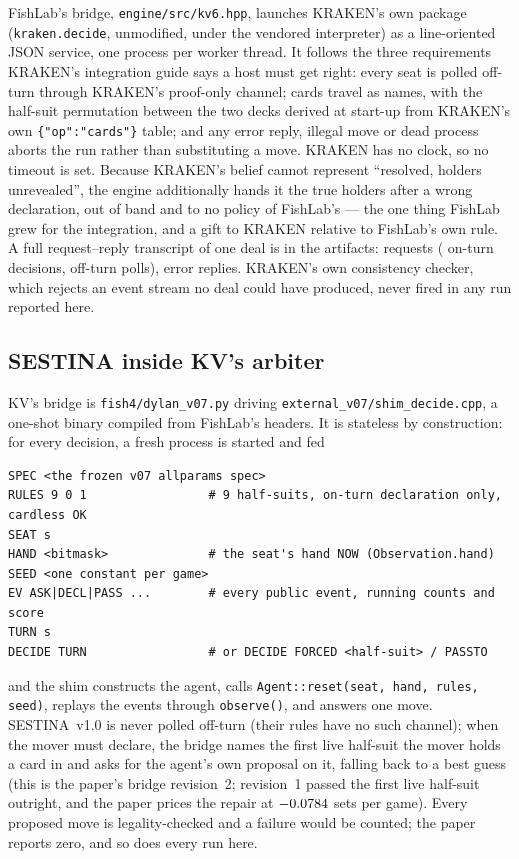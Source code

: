 \documentclass[11pt]{article}
\newcommand{\code}[1]{\texttt{#1}}
\newcommand{\sestina}{\mbox{SESTINA v1.0}}
\begin{document}
FishLab's bridge, \code{engine/src/kv6.hpp}, launches KRAKEN's own package (\code{kraken.decide},
unmodified, under the vendored interpreter) as a line-oriented JSON service, one process per worker
thread. It follows the three requirements KRAKEN's integration guide says a host must get right: every
seat is polled off-turn through KRAKEN's proof-only channel; cards travel as names, with the half-suit
permutation between the two decks derived at start-up from KRAKEN's own \code{\{"op":"cards"\}} table;
and any error reply, illegal move or dead process aborts the run rather than substituting a move. KRAKEN
has no clock, so no timeout is set. Because KRAKEN's belief cannot represent ``resolved, holders
unrevealed'', the engine additionally hands it the true holders after a wrong declaration, out of band
and to no policy of FishLab's --- the one thing FishLab grew for the integration, and a gift to KRAKEN
relative to FishLab's own rule. A full request--reply transcript of one deal is in the artifacts:
\kcBrRequests{} requests (\kcBrDecide{} on-turn decisions, \kcBrOffturn{} off-turn polls),
\kcBrErrors{} error replies. KRAKEN's own consistency checker, which rejects an event stream no deal
could have produced, never fired in any run reported here.

\subsection{SESTINA inside KV's arbiter}
\label{sec:theirbridge}

KV's bridge is \code{fish4/dylan\_v07.py} driving \code{external\_v07/shim\_decide.cpp}, a one-shot
binary compiled from FishLab's headers. It is stateless by construction: for every decision, a fresh
process is started and fed
\begin{lstlisting}
SPEC <the frozen v07 allparams spec>
RULES 9 0 1                 # 9 half-suits, on-turn declaration only, cardless OK
SEAT s
HAND <bitmask>              # the seat's hand NOW (Observation.hand)
SEED <one constant per game>
EV ASK|DECL|PASS ...        # every public event, running counts and score
TURN s
DECIDE TURN                 # or DECIDE FORCED <half-suit> / PASSTO
\end{lstlisting}
and the shim constructs the agent, calls \code{Agent::reset(seat, hand, rules, seed)}, replays the
events through \code{observe()}, and answers one move. \sestina{} is never polled off-turn (their rules
have no such channel); when the mover must declare, the bridge names the first live half-suit the mover holds a card
in and asks for the agent's own proposal on it, falling back to a best guess (this is the paper's
bridge revision~2; revision~1 passed the first
live half-suit outright, and the paper prices the repair at $-0.0784$ sets per game).
Every proposed move is legality-checked and a failure would be counted; the paper reports zero, and so
does every run here.
\end{document}
